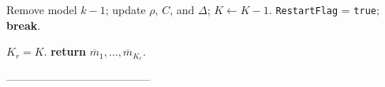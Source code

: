 \begin{algorithm}[!ht]
{{{{            %
                Remove model $k-1$; update $\rho$, $C$, and $\Delta$;  \;
                $K \leftarrow K-1$.\;
                {\tt RestartFlag} = {\tt true}; \;
                \textbf{break}.\;
                }


        }
}
}

$K_r = K$.\;
\textbf{return} $\overline{m}_1,\dots,\overline{m}_{K_r}$.
\end{algorithm}


---------------------------------------


